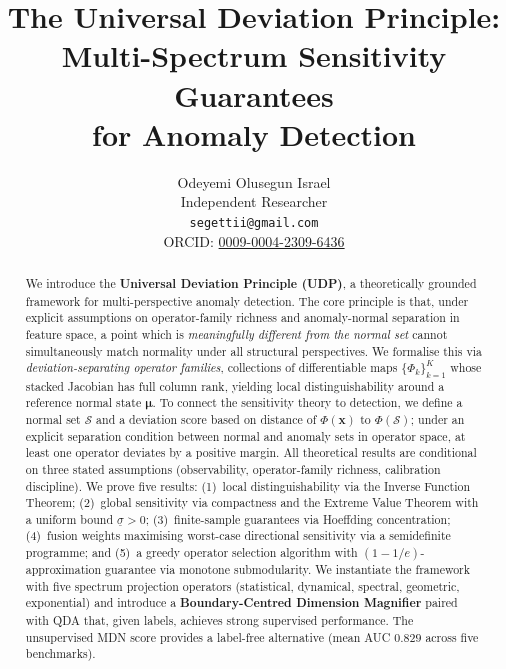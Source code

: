 \documentclass{article}
\title{The Universal Deviation Principle: Multi-Spectrum Sensitivity Guarantees\\for Anomaly Detection}
\author{
  Odeyemi Olusegun Israel \\
  Independent Researcher \\
  \texttt{segettii@gmail.com} \\
  ORCID: \href{https://orcid.org/0009-0004-2309-6436}{0009-0004-2309-6436}
}
\newcommand{\Nset}{\mathcal{S}}  %
\begin{document}
\maketitle

\begin{abstract}
We introduce the \textbf{Universal Deviation Principle (UDP)}, a theoretically grounded framework for multi-perspective anomaly detection. The core principle is that, under explicit assumptions on operator-family richness and anomaly-normal separation in feature space, a point which is \emph{meaningfully different from the normal set} cannot simultaneously match normality under all structural perspectives. We formalise this via \emph{deviation-separating operator families}, collections of differentiable maps $\{\Phi_k\}_{k=1}^K$ whose stacked Jacobian has full column rank, yielding local distinguishability around a reference normal state $\bm{\mu}$. To connect the sensitivity theory to detection, we define a normal set $\Nset$ and a deviation score based on distance of $\Phi(\mathbf{x})$ to $\Phi(\Nset)$; under an explicit separation condition between normal and anomaly sets in operator space, at least one operator deviates by a positive margin. All theoretical results are conditional on three stated assumptions (observability, operator-family richness, calibration discipline). We prove five results: (1)~local distinguishability via the Inverse Function Theorem; (2)~global sensitivity via compactness and the Extreme Value Theorem with a uniform bound $\underline{\sigma} > 0$; (3)~finite-sample guarantees via Hoeffding concentration; (4)~fusion weights maximising worst-case directional sensitivity via a semidefinite programme; and (5)~a greedy operator selection algorithm with $(1-1/e)$-approximation guarantee via monotone submodularity. We instantiate the framework with five spectrum projection operators (statistical, dynamical, spectral, geometric, exponential) and introduce a \textbf{Boundary-Centred Dimension Magnifier} paired with QDA that, given labels, achieves strong supervised performance. The unsupervised MDN score provides a label-free alternative (mean AUC $0.829$ across five benchmarks).


\end{abstract}
\end{document}
